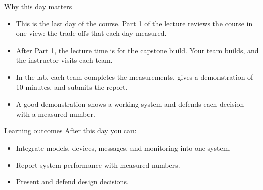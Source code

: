 \begin{frame}{Why this day matters}
  \begin{itemize}
    \item This is the last day of the course. Part 1 of the lecture reviews
          the course in one view: the trade-offs that each day measured.
    \item After Part 1, the lecture time is for the capstone build. Your team
          builds, and the instructor visits each team.
    \item In the lab, each team completes the measurements, gives a
          demonstration of 10 minutes, and submits the report.
    \item A good demonstration shows a working system and defends each
          decision with a measured number.
  \end{itemize}
\end{frame}

\begin{frame}{Learning outcomes}
  After this day you can:
  \begin{itemize}
    \item Integrate models, devices, messages, and monitoring into one system.
    \item Report system performance with measured numbers.
    \item Present and defend design decisions.
  \end{itemize}
\end{frame}
